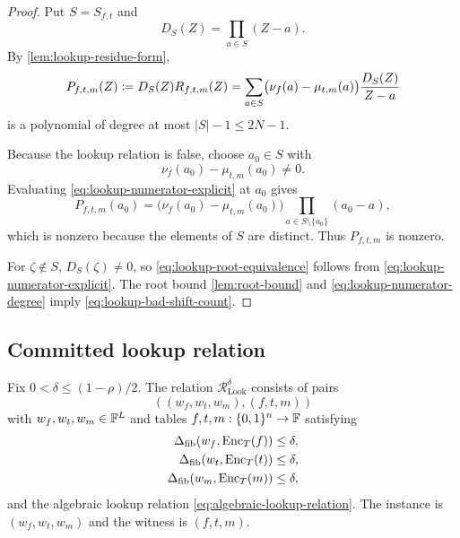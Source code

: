 \begin{proof}
Put $S=S_{f,t}$ and
\begin{equation}
  D_S(Z)=\prod_{a\in S}(Z-a).
  \label{eq:lookup-squarefree-denominator}
\end{equation}
By \cref{lem:lookup-residue-form},
\begin{equation}
  P_{f,t,m}(Z)
  \coloneqq
  D_S(Z)R_{f,t,m}(Z)
  =
  \sum_{a\in S}
  \bigl(\nu_f(a)-\mu_{t,m}(a)\bigr)
  \frac{D_S(Z)}{Z-a}
  \label{eq:lookup-numerator-explicit}
\end{equation}
is a polynomial of degree at most $|S|-1\le2N-1$.

Because the lookup relation is false, choose $a_0\in S$ with
\[
  \nu_f(a_0)-\mu_{t,m}(a_0)\ne0.
\]
Evaluating \eqref{eq:lookup-numerator-explicit} at $a_0$ gives
\[
  P_{f,t,m}(a_0)
  =
  \bigl(\nu_f(a_0)-\mu_{t,m}(a_0)\bigr)
  \prod_{a\in S\setminus\{a_0\}}(a_0-a),
\]
which is nonzero because the elements of $S$ are distinct.  Thus $P_{f,t,m}$ is nonzero.

For $\zeta\notin S$, $D_S(\zeta)\ne0$, so \eqref{eq:lookup-root-equivalence} follows from \eqref{eq:lookup-numerator-explicit}.  The root bound \cref{lem:root-bound} and \eqref{eq:lookup-numerator-degree} imply \eqref{eq:lookup-bad-shift-count}.
\end{proof}

\subsection{Committed lookup relation}
\label{sec:committed-lookup-relation}

\begin{definition}
\label{def:lookup-relation}
Fix $0<\delta\le(1-\rho)/2$.  The relation $\mathcal R^{\delta}_{\mathrm{Look}}$ consists of pairs
\[
  ((w_f,w_t,w_m),(f,t,m))
\]
with $w_f,w_t,w_m\in\mathbb{F}^L$ and tables $f,t,m:\{0,1\}^n\to\mathbb{F}$ satisfying
\begin{align}
  \Delta_{\mathrm{fib}}(w_f,\operatorname{Enc}_T(f))&\le\delta,
  \label{eq:lookup-relation-f}\\
  \Delta_{\mathrm{fib}}(w_t,\operatorname{Enc}_T(t))&\le\delta,
  \label{eq:lookup-relation-t}\\
  \Delta_{\mathrm{fib}}(w_m,\operatorname{Enc}_T(m))&\le\delta,
  \label{eq:lookup-relation-m}
\end{align}
and the algebraic lookup relation \eqref{eq:algebraic-lookup-relation}.  The instance is $(w_f,w_t,w_m)$ and the witness is $(f,t,m)$.
\end{definition}

